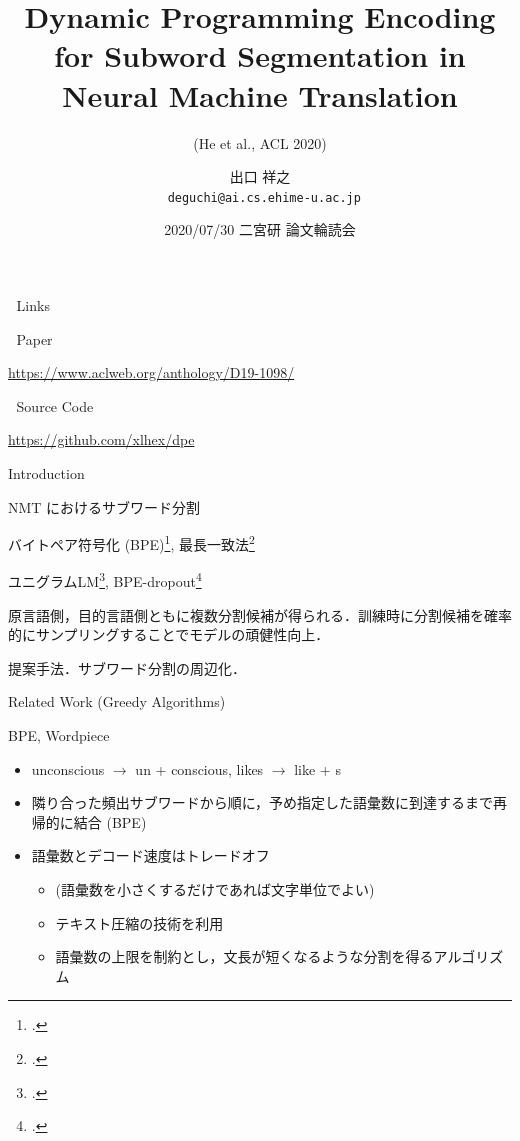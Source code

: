 \documentclass[unicode, 12pt, aspectratio=43]{beamer}
\author{出口 祥之 \\ \lower2.0pt\hbox{\materials} \texttt{deguchi@ai.cs.ehime-u.ac.jp}}
\date{2020/07/30 二宮研 論文輪読会}
\title{Dynamic Programming Encoding for Subword Segmentation in Neural Machine Translation}
\subtitle{(He et al., ACL 2020)}
\institute{}
\begin{document}
\maketitle

\begin{frame}[label={sec:org921bd3a}]{\hbox{\octicons} Links}
\begin{block}{\hbox{\octicons} Paper}
\begin{block}{\url{https://www.aclweb.org/anthology/D19-1098/}}
\end{block}
\end{block}
\begin{block}{\hbox{\octicons} Source Code}
\begin{block}{\url{https://github.com/xlhex/dpe}}
\end{block}
\end{block}
\end{frame}

\begin{frame}[label={sec:org23571bb}]{Introduction}
\begin{block}{NMT におけるサブワード分割}
\begin{description}
\item[{貪欲法:}] バイトペア符号化 (BPE)\footcite{sennrich-etal-2016-neural}, 最長一致法\footcite{wu-etal-2016-googles}
\item[{確率的アルゴリズム:}] ユニグラムLM\footcite{kudo-2018-subword}, BPE-dropout\footcite{provilkov-etal-2020-bpe}
\item \small 原言語側，目的言語側ともに複数分割候補が得られる．訓練時に分割候補を確率的にサンプリングすることでモデルの頑健性向上． \normalsize
\item[{動的計画法:}] 提案手法．サブワード分割の周辺化．
\end{description}
\end{block}
\end{frame}

\begin{frame}[label={sec:org7be64b4}]{Related Work (Greedy Algorithms)}
\begin{block}{BPE, Wordpiece}
\begin{itemize}
\item unconscious \(\rightarrow\) un + conscious, likes \(\rightarrow\) like + s
\item 隣り合った頻出サブワードから順に，予め指定した語彙数に到達するまで再帰的に結合 (BPE)
\item 語彙数とデコード速度はトレードオフ
\begin{itemize}
\item (語彙数を小さくするだけであれば文字単位でよい)
\item テキスト圧縮の技術を利用
\item 語彙数の上限を制約とし，文長が短くなるような分割を得るアルゴリズム
\end{itemize}
\end{itemize}
\end{block}
\end{frame}
\end{document}

